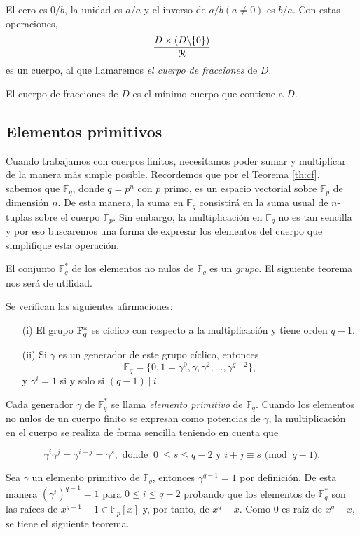 El cero es $0/b$, la unidad es $a/a$ y el inverso de $a/b (a \neq 0)$ es $b/a$. Con estas operaciones, $$ \frac{D \times (D \backslash \{0\})}{\mathcal R}$$ es un cuerpo, al que llamaremos \emph{el cuerpo de fracciones} de $D$. 

El cuerpo de fracciones de $D$ es el mínimo cuerpo que contiene a $D$.


\subsection{Elementos primitivos}

Cuando trabajamos con cuerpos finitos, necesitamos poder sumar y multiplicar de la manera más simple posible. Recordemos que por el Teorema \ref{th:cf}, sabemos que $\mathbb{F}_q$, donde $q = p^n$ con $p$ primo, es un espacio vectorial sobre $\mathbb{F}_p$ de dimensión $n$. De esta manera, la suma en $\mathbb{F}_q$ consistirá en la suma usual de $n$-tuplas sobre el cuerpo $\mathbb{F}_p$. Sin embargo, la multiplicación en $\mathbb{F}_q$ no es tan sencilla y por eso buscaremos una forma de expresar los elementos del cuerpo que simplifique esta operación.

El conjunto $\mathbb{F}_q^*$ de los elementos no nulos de $\mathbb{F}_q$ es un \emph{grupo}. El siguiente teorema nos será de utilidad.

\begin{teorema}\label{th:ep}
  Se verifican las siguientes afirmaciones:
  \begin{itemize}
    \item[(i)] El grupo $\mathbb{F}_q^*$ es cíclico con respecto a la multiplicación y tiene orden $q-1$.
    \item[(ii)] Si $\gamma$ es un generador de este grupo cíclico, entonces $$\mathbb{F}_q = \{0,1 = \gamma^0,\gamma,\gamma^2,\dots,\gamma^{q-2}\},$$ y $\gamma^i = 1$ si y solo si $(q-1) \ | \ i.$ 
  \end{itemize}  
\end{teorema}

Cada generador $\gamma$ de $\mathbb{F}_q^*$ se llama \emph{elemento primitivo} de $\mathbb{F}_q$. Cuando los elementos no nulos de un cuerpo finito se expresan como potencias de $\gamma$, la multiplicación en el cuerpo se realiza de forma sencilla teniendo en cuenta que 

$$\gamma^i\gamma^j = \gamma^{i+j} = \gamma^s, \text{   donde   } \ 0 \  \leq s \leq q-2 \text{  \  y  \  } i + j \equiv s \text{    (mod   }  \ q-1). $$

Sea $\gamma$ un elemento primitivo de $\mathbb{F}_q$, entonces $\gamma^{q-1} = 1$ por definición. De esta manera $(\gamma^i)^{q-1} = 1$ para $0 \leq i \leq q-2$ probando que los elementos de $\mathbb{F}_q^*$ son las raíces de $x^{q-1} - 1 \in \mathbb{F}_p[x]$ y, por tanto, de $x^q - x$. Como $0$ es raíz de $x^q - x$, se tiene el siguiente teorema.

